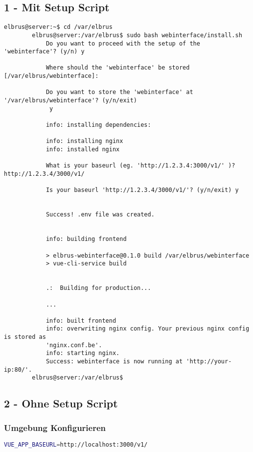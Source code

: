 	\subsection{1 - Mit Setup Script}
	
	\lstset{style=commands}
	\begin{lstlisting}[caption={Ausführen des 'install.sh' Scripts.}]
		elbrus@server:~$ cd /var/elbrus
		elbrus@server:/var/elbrus$ sudo bash webinterface/install.sh
			Do you want to proceed with the setup of the 'webinterface'? (y/n) y
			
			Where should the 'webinterface' be stored [/var/elbrus/webinterface]:
			
			Do you want to store the 'webinterface' at '/var/elbrus/webinterface'? (y/n/exit)
			 y
			
			info: installing dependencies:
			
			info: installing nginx
			info: installed nginx
			
			What is your baseurl (eg. 'http://1.2.3.4:3000/v1/' )? http://1.2.3.4/3000/v1/
			
			Is your baseurl 'http://1.2.3.4/3000/v1/'? (y/n/exit) y
			
			
			Success! .env file was created.
			
			
			info: building frontend
			
			> elbrus-webinterface@0.1.0 build /var/elbrus/webinterface
			> vue-cli-service build
			
			
			.:  Building for production...
			
			...
			
			info: built frontend
			info: overwriting nginx config. Your previous nginx config is stored as
			'nginx.conf.be'.
			info: starting nginx.
			Success: webinterface is now running at 'http://your-ip:80/'.
		elbrus@server:/var/elbrus$
	\end{lstlisting}
	\newpage
	
	\subsection{2 - Ohne Setup Script}
	
	\subsubsection[file config]{Umgebung Konfigurieren}
	\lstset{style=files}
	\begin{lstlisting}[caption={Anhand von '.env.example' eigene '.env' Datei anlegen.}, language=bash, keywords={CONFIGPATH, MAINPATH}, keywordstyle=\color{red}]
		VUE_APP_BASEURL=http://localhost:3000/v1/
	\end{lstlisting}
	
